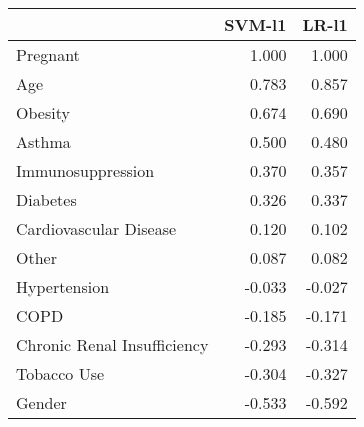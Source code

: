 \begin{tabular}{lrr}
\toprule
{} &  SVM-l1 &  LR-l1 \\
\midrule
Pregnant                    &   1.000 &  1.000 \\
Age                         &   0.783 &  0.857 \\
Obesity                     &   0.674 &  0.690 \\
Asthma                      &   0.500 &  0.480 \\
Immunosuppression           &   0.370 &  0.357 \\
Diabetes                    &   0.326 &  0.337 \\
Cardiovascular Disease      &   0.120 &  0.102 \\
Other                       &   0.087 &  0.082 \\
Hypertension                &  -0.033 & -0.027 \\
COPD                        &  -0.185 & -0.171 \\
Chronic Renal Insufficiency &  -0.293 & -0.314 \\
Tobacco Use                 &  -0.304 & -0.327 \\
Gender                      &  -0.533 & -0.592 \\
\bottomrule
\end{tabular}
